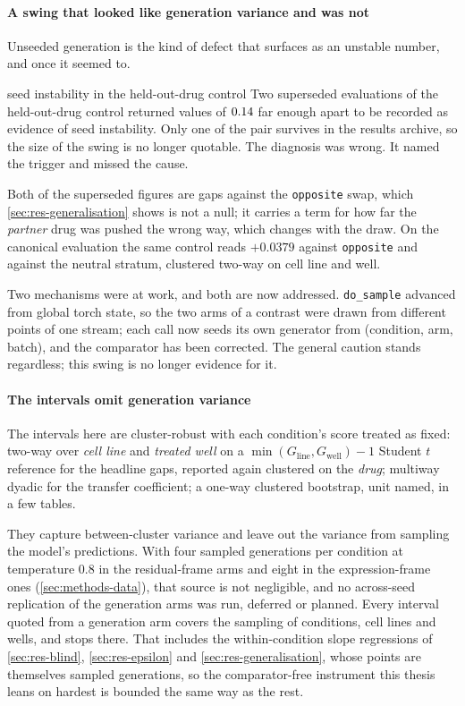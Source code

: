 \paragraph{A swing that looked like generation variance and was not} Unseeded
generation is the kind of defect that surfaces as an unstable number, and once
it seemed to.

\begin{withdrawn}{seed instability in the held-out-drug control}
Two superseded evaluations of the held-out-drug control returned values of
$0.14$ far enough apart to be recorded as evidence of seed instability. Only one
of the pair survives in the results archive, so the size of the swing is no
longer quotable. The diagnosis was wrong. It named the trigger and missed the
cause.
\end{withdrawn}

Both of the superseded figures are gaps against the \texttt{opposite} swap, which
\cref{sec:res-generalisation} shows is not a null; it carries a term for how far
the \emph{partner} drug was pushed the wrong way, which changes with the
draw. On the canonical evaluation the same
control reads $+0.0379$ against \texttt{opposite} and
 against the neutral stratum, clustered two-way on
cell line and well.

Two mechanisms were at work, and both are now addressed. \texttt{do\_sample}
advanced from global torch state, so the two arms of a contrast were drawn from
different points of one
stream; each call now seeds its own generator from (condition, arm, batch), and
the comparator has been corrected. The general caution stands regardless; this
swing is no longer evidence for it.

\paragraph{The intervals omit generation variance} The intervals here are
cluster-robust with each condition's score treated as fixed: two-way over
\emph{cell line} and \emph{treated well} on a $\min(G_{\textrm{line}},
G_{\textrm{well}}) - 1$ Student $t$ reference for the headline gaps, reported
again clustered on the \emph{drug}; multiway dyadic for the transfer
coefficient; a one-way clustered bootstrap, unit named, in a few tables.

They capture between-cluster variance and leave out the variance from sampling
the model's predictions. With four sampled generations per condition at temperature
$0.8$ in the residual-frame arms and eight in the expression-frame ones
(\cref{sec:methods-data}), that source is not negligible, and no across-seed
replication of the generation arms was run, deferred or planned. Every interval
quoted from a generation arm covers the sampling of conditions, cell lines and
wells, and stops there. That includes the within-condition slope regressions of
\cref{sec:res-blind}, \cref{sec:res-epsilon} and \cref{sec:res-generalisation},
whose points are themselves sampled generations, so the comparator-free
instrument this thesis leans on hardest is bounded the same way as the rest.

